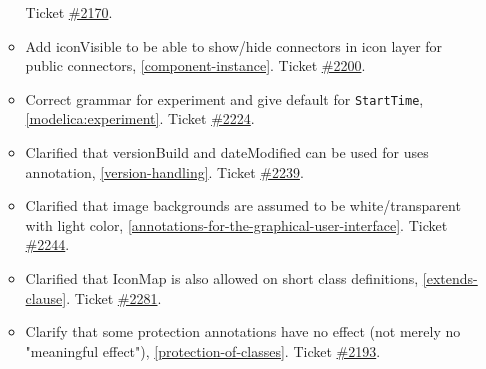 \begin{itemize}
\begin{itemize}
Ticket \href{https://github.com/modelica/ModelicaSpecification/issues/2170}{\#2170}.
\item Add iconVisible to be able to show/hide connectors in icon layer for public connectors, \cref{component-instance}.
Ticket \href{https://github.com/modelica/ModelicaSpecification/issues/2200}{\#2200}.
\item Correct grammar for experiment and give default for \lstinline!StartTime!, \cref{modelica:experiment}.
Ticket \href{https://github.com/modelica/ModelicaSpecification/issues/2224}{\#2224}.
\item Clarified that versionBuild and dateModified can be used for uses annotation, \cref{version-handling}.
Ticket \href{https://github.com/modelica/ModelicaSpecification/issues/2239}{\#2239}.
\item Clarified that image backgrounds are assumed to be white/transparent with light color, \cref{annotations-for-the-graphical-user-interface}.
Ticket \href{https://github.com/modelica/ModelicaSpecification/issues/2244}{\#2244}.
\item Clarified that IconMap is also allowed on short class definitions, \cref{extends-clause}.
Ticket \href{https://github.com/modelica/ModelicaSpecification/issues/2281}{\#2281}.
\item Clarify that some protection annotations have no effect (not merely no "meaningful effect"), \cref{protection-of-classes}.
Ticket \href{https://github.com/modelica/ModelicaSpecification/issues/2193}{\#2193}.
\end{itemize}


\end{itemize}
